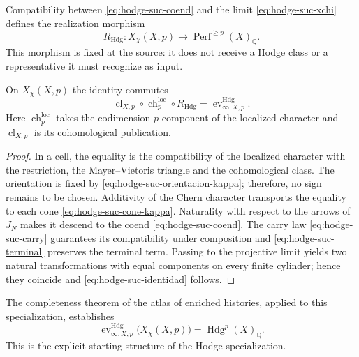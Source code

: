 Compatibility between \eqref{eq:hodge-suc-coend} and the limit
\eqref{eq:hodge-suc-xchi} defines the realization morphism
\begin{equation}\label{eq:hodge-suc-realizacion}
 R_{\mathrm{Hdg}}:
 X_{\chi}(X,p)\longrightarrow
 \operatorname{Perf}^{\geq p}(X)_{\mathbb Q}.
\end{equation}
This morphism is fixed at the source: it does not receive a Hodge class
or a representative it must recognize as input.

\begin{theorem}
\label{thm:hodge-suc-identidad}
On \(X_{\chi}(X,p)\) the identity commutes
\begin{equation}\label{eq:hodge-suc-identidad}
 \operatorname{cl}_{X,p}\circ
 \operatorname{ch}^{\mathrm{loc}}_{p}\circ
 R_{\mathrm{Hdg}}
 =\operatorname{ev}^{\mathrm{Hdg}}_{\infty,X,p}.
\end{equation}
Here
\(\operatorname{ch}^{\mathrm{loc}}_{p}\) takes the codimension
\(p\) component of the localized character and
\(\operatorname{cl}_{X,p}\) is its cohomological publication.
\end{theorem}

\begin{proof}
In a cell, the equality is the compatibility of the localized character with
the restriction, the Mayer--Vietoris triangle and the cohomological class. The
orientation is fixed by \eqref{eq:hodge-suc-orientacion-kappa};
therefore, no sign remains to be chosen. Additivity of the Chern character
transports the equality to each cone \eqref{eq:hodge-suc-cone-kappa}.
Naturality with respect to the arrows of \(J_N\) makes it descend to the coend
\eqref{eq:hodge-suc-coend}. The carry law
\eqref{eq:hodge-suc-carry} guarantees its compatibility under composition and
\eqref{eq:hodge-suc-terminal} preserves the terminal term. Passing to the
projective limit yields two natural transformations with equal
components on every finite cylinder; hence they coincide and
\eqref{eq:hodge-suc-identidad} follows.
\end{proof}

The completeness theorem of the atlas of enriched histories, applied to
this specialization, establishes
\begin{equation}\label{eq:hodge-suc-completitud}
 \operatorname{ev}^{\mathrm{Hdg}}_{\infty,X,p}
 \bigl(X_{\chi}(X,p)\bigr)
 =\operatorname{Hdg}^{p}(X)_{\mathbb Q}.
\end{equation}
This is the explicit starting structure of the Hodge specialization.

